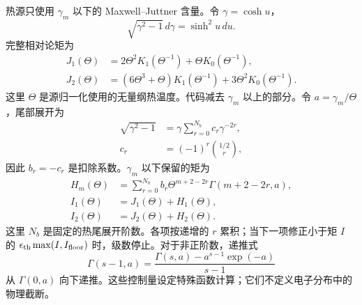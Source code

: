 \documentclass[twocolumn]{aastex702}
\begin{document}
热源只使用 \(\gamma_m\) 以下的 Maxwell--Juttner 含量。令 \(\gamma=\cosh u\)，
\begin{equation}
\sqrt{\gamma^2-1}\,d\gamma=\sinh^2u\,du .
\end{equation}
完整相对论矩为
\begin{equation}
\begin{aligned}
J_1(\Theta)&=2\Theta^2K_1(\Theta^{-1})
+\Theta K_0(\Theta^{-1}),\\
J_2(\Theta)&=(6\Theta^3+\Theta)K_1(\Theta^{-1})
+3\Theta^2K_0(\Theta^{-1}).
\end{aligned}
\end{equation}
这里 \(\Theta\) 是源归一化使用的无量纲热温度。代码减去 \(\gamma_m\) 以上的部分。令 \(a=\gamma_m/\Theta\)，尾部展开为
\begin{equation}
\begin{aligned}
\sqrt{\gamma^2-1}
&=\gamma\sum_{r=0}^{N_b} c_r\gamma^{-2r},\\
c_r&=(-1)^r\binom{1/2}{r},
\end{aligned}
\end{equation}
因此 \(b_r=-c_r\) 是扣除系数。\(\gamma_m\) 以下保留的矩为
\begin{equation}
\begin{aligned}
H_m(\Theta)&=\sum_{r=0}^{N_b}
b_r\Theta^{m+2-2r}\Gamma(m+2-2r,a),\\
I_1(\Theta)&=J_1(\Theta)+H_1(\Theta),\\
I_2(\Theta)&=J_2(\Theta)+H_2(\Theta).
\end{aligned}
\end{equation}
这里 \(N_b\) 是固定的热尾展开阶数。各项按递增的 \(r\) 累积；当下一项修正小于矩 \(I\) 的 \(\epsilon_{\rm th}\max(I,I_{\rm floor})\) 时，级数停止。对于非正阶数，递推式
\begin{equation}
\Gamma(s-1,a)=\frac{\Gamma(s,a)-a^{s-1}\exp(-a)}{s-1}
\end{equation}
从 \(\Gamma(0,a)\) 向下递推。这些控制量设定特殊函数计算；它们不定义电子分布中的物理截断。
\end{document}
